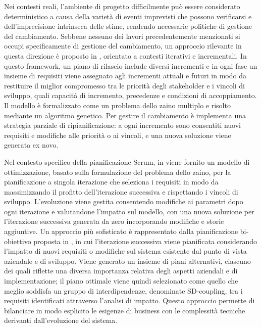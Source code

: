 \documentclass[12pt,a4paper,openright,twoside]{book}
\begin{document}
Nei contesti reali, l'ambiente di progetto difficilmente può essere considerato deterministico a causa della varietà di eventi imprevisti che possono verificarsi e dell'imprecisione intrinseca delle stime, rendendo necessarie politiche di gestione del cambiamento. Sebbene nessuno dei lavori precedentemente menzionati si occupi specificamente di gestione del cambiamento, un approccio rilevante in questa direzione è proposto in \cite{GREER2004243}, orientato a contesti iterativi e incrementali. In questo framework, un piano di rilascio include diversi incrementi e in ogni fase un insieme di requisiti viene assegnato agli incrementi attuali e futuri in modo da restituire il miglior compromesso tra le priorità degli stakeholder e i vincoli di sviluppo, quali capacità di incremento, precedenze e condizioni di accoppiamento. Il modello è formalizzato come un problema dello zaino multiplo e risolto mediante un algoritmo genetico. Per gestire il cambiamento è implementa una strategia parziale di ripianificazione: a ogni incremento sono consentiti nuovi requisiti e modifiche alle priorità o ai vincoli, e una nuova soluzione viene generata ex novo.

\vspace{1em}

Nel contesto specifico della pianificazione Scrum, in \cite{Li2010375} viene fornito un modello di ottimizzazione, basato sulla formulazione del problema dello zaino, per la pianificazione a singola iterazione che seleziona i requisiti in modo da massimizzando il profitto dell'iterazione successiva e rispettando i vincoli di sviluppo.
L'evoluzione viene gestita consentendo modifiche ai parametri dopo ogni iterazione e valutandone l'impatto sul modello, con una nuova soluzione per l'iterazione successiva generata da zero incorporando modifiche e storie aggiuntive. Un approccio più sofisticato è rappresentato dalla pianificazione bi-obiettivo proposta in \cite{10.1145/1287624.1287641}, in cui l'iterazione successiva viene pianificata considerando l'impatto di nuovi requisiti o modifiche sul sistema esistente dal punto di vista aziendale e di sviluppo. Viene generato un insieme di piani alternativi, ciascuno dei quali riflette una diversa importanza relativa degli aspetti aziendali e di implementazione; il piano ottimale viene quindi selezionato come quello che meglio soddisfa un gruppo di interdipendenze, denominate SD-coupling, tra i requisiti identificati attraverso l'analisi di impatto. Questo approccio permette di bilanciare in modo esplicito le esigenze di business con le complessità tecniche derivanti dall'evoluzione del sistema.
\end{document}
